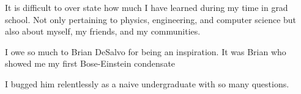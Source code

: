 \begin{acknowledge}

It is difficult to over state how much I have learned during my time in grad school. Not only pertaining to physics, engineering, and computer science but also about myself, my friends, and my communities.

I owe so much to Brian DeSalvo for being an inspiration. It was Brian who showed me my first Bose-Einstein condensate 

I bugged him relentlessly as a naive undergraduate with so many questions.



\end{acknowledge}